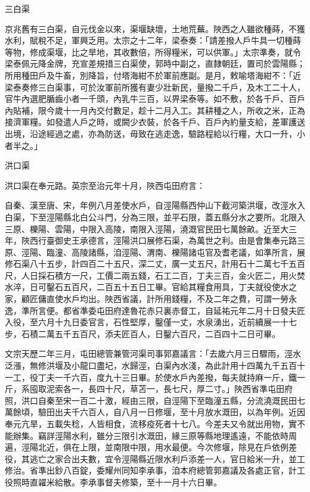 \begin{pinyinscope}
 三白渠



 京兆舊有三白渠，自元伐金以來，渠堰缺壞，土地荒蕪。陜西之人雖欲種蒔，不獲水利，賦稅不足，軍興乏用。太宗之十二年，梁泰奏：「請差撥人戶牛具一切種蒔等物，修成渠堰，比之旱地，其收數倍，所得糧米，可以供軍。」太宗準奏，就令梁泰佩元降金牌，充宣差規措三白渠使，郭時中副之，直隸朝廷，置司於雲陽縣；所用種田戶及牛畜，別降旨，付塔海紺不於軍前應副。是月，敕喻塔海紺不：「近梁泰奏修三白渠事，可於汝軍前所獲有妻少壯新民，量撥二千戶，及木工二十人，官牛內選肥腯齒小者一千頭，內乳牛三百，以畀梁泰等。如不敷，於各千戶、百戶內貼補，限今歲十一月內交付數足，趁十二月入工。其耕種之人，所收之米，正為接濟軍糧。如發遣人戶之時，或闕少衣裝，於各千戶、百戶內約量支給，差軍護送出境，沿途經過之處，亦為防送，毋致在逃走逸，驗路程給以行糧，大口一升，小者半之。」



 洪口渠



 洪口渠在奉元路。英宗至治元年十月，陜西屯田府言：



 自秦、漢至唐、宋，年例八月差使水戶，自涇陽縣西仲山下截河築洪堰，改涇水入白渠，下至涇陽縣北白公斗門，分為三限，並平石限，蓋五縣分水之要所。北限入三原、櫟陽、雲陽，中限入高陵，南限入涇陽，澆溉官民田七萬餘畝。近至大三年，陜西行臺御史王承德言，涇陽洪口展修石渠，為萬世之利。由是會集奉元路三原、涇陽、臨潼、高陵諸縣，洎涇陽、渭南、櫟陽諸屯官及耆老議，如準所言，展修石渠八十五步，計四百二十五尺，深二丈，廣一丈五尺，計用石十二萬七千五百尺，人日採石積方一尺，工價二兩五錢，石工二百，丁夫三百，金火匠二，用火焚水淬，日可鑿石五百尺，二百五十五日工畢。官給其糧食用具，丁夫就役使水之家，顧匠傭直使水戶均出。陜西省議，計所用錢糧，不及二年之費，可謂一勞永逸，準所言便。都省準委屯田府達魯花赤只裏赤督工，自延祐元年二月十日發夫匠入役，至六月十九日委官言，石性堅厚，鑿僅一丈，水泉湧出，近前續展一十七步，石積二萬五千五百尺，添夫匠百人，日鑿六百尺，二百四十二日可畢。



 文宗天歷二年三月，屯田總管兼管河渠司事郭嘉議言：「去歲六月三日驟雨，涇水泛漲，無修洪堰及小龍口盡圮，水歸涇，白渠內水淺，為此計用十四萬九千五百十一工，役丁夫一千六百，度九十三日畢。於使水戶內差撥，每夫就持麻一斤，鐵一斤，系囤取泥索各一，長四十尺，草苫一，長七尺，厚二寸。」陜西省準屯田府照，洪口自秦至宋一百二十激，經由三限，自涇陽下至臨潼五縣，分流澆溉民田七萬餘頃，驗田出夫千六百人，自八月一日修堰，至十月放水溉田，以為年例。近因奉元亢旱，五載失稔，人皆相食，流移疫死者十七八。今差夫又令就出用物，實不能辦集。竊詳涇陽水利，雖分三限引水溉田，緣三原等縣地理遙遠，不能依時周遍，涇陽北近，俱在上限，並南限中限，用水最便。今次修堰，除見在戶依例差役，其逃亡之家合出夫數，宜令涇陽縣近限水利戶添差一人，官日給米一升，並工修治。省準出鈔八百錠，委耀州同知李承事，洎本府總管郭嘉議及各處正官，計工役照時直糴米給散。李承事督夫修築，至十一月十六日畢。




\end{pinyinscope}
